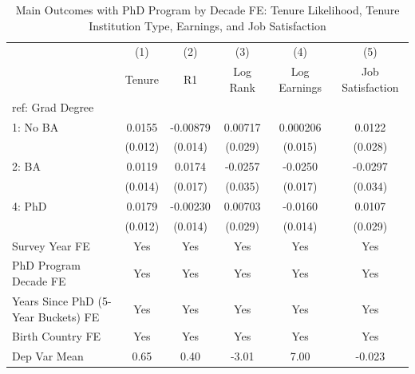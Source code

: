 \begin{table}[htbp]\centering
\def\sym#1{\ifmmode^{#1}\else\(^{#1}\)\fi}
\caption{Main Outcomes with PhD Program by Decade FE: Tenure Likelihood, Tenure Institution Type, Earnings, and Job Satisfaction \label{tab1}}
\begin{tabular}{l*{5}{c}}
\hline\hline
  &\multicolumn{1}{c}{(1)}&\multicolumn{1}{c}{(2)}&\multicolumn{1}{c}{(3)}&\multicolumn{1}{c}{(4)}&\multicolumn{1}{c}{(5)}\\
  &\multicolumn{1}{c}{Tenure}&\multicolumn{1}{c}{R1}&\multicolumn{1}{c}{Log Rank}&\multicolumn{1}{c}{Log Earnings}&\multicolumn{1}{c}{Job Satisfaction}\\
\hline
ref: Grad Degree&                     &                     &                     &                     &                     \\
[1em]
1: No BA&      0.0155         &    -0.00879         &     0.00717         &    0.000206         &      0.0122         \\
  &     (0.012)         &     (0.014)         &     (0.029)         &     (0.015)         &     (0.028)         \\
[1em]
2: BA&      0.0119         &      0.0174         &     -0.0257         &     -0.0250         &     -0.0297         \\
  &     (0.014)         &     (0.017)         &     (0.035)         &     (0.017)         &     (0.034)         \\
[1em]
4: PhD&      0.0179         &    -0.00230         &     0.00703         &     -0.0160         &      0.0107         \\
  &     (0.012)         &     (0.014)         &     (0.029)         &     (0.014)         &     (0.029)         \\
[1em]
Survey Year FE&         Yes         &         Yes         &         Yes         &         Yes         &         Yes         \\
[1em]
PhD Program Decade FE&         Yes         &         Yes         &         Yes         &         Yes         &         Yes         \\
[1em]
Years Since PhD (5-Year Buckets) FE&         Yes         &         Yes         &         Yes         &         Yes         &         Yes         \\
[1em]
Birth Country FE&         Yes         &         Yes         &         Yes         &         Yes         &         Yes         \\
\hline
Dep Var Mean&        0.65         &        0.40         &       -3.01         &        7.00         &      -0.023         \\

\end{tabular}
\end{table}
